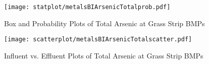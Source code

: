         \begin{figure}[hb]   %
            \centering
            \texttt{[image: statplot/metalsBIArsenicTotalprob.pdf]}
            \caption{Box and Probability Plots of Total Arsenic at Grass Strip BMPs}
        \end{figure}         %
        
        
        \begin{figure}[hb]   %
            \centering
            \texttt{[image: scatterplot/metalsBIArsenicTotalscatter.pdf]}
            \caption{Influent vs. Effluent Plots of Total Arsenic at Grass Strip BMPs}
        \end{figure}         %
        \clearpage
        